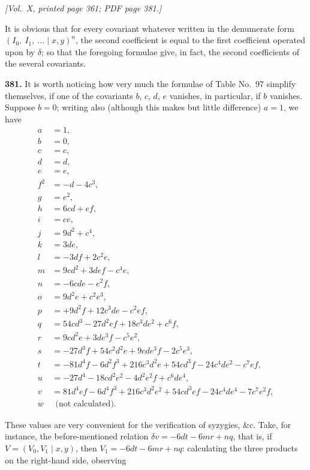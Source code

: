 \documentclass[11pt]{article}
\begin{document}
\newpage

\noindent\textit{[Vol.~X, printed page 361; PDF page 381.]}

\medskip

It is obvious that for every covariant whatever written in the denumerate form $(I_{0},\ I_{1},\ \ldots \mid x,y)^{n}$, the second coefficient is equal to the first coefficient operated upon by $\delta$; so that the foregoing formulae give, in fact, the second coefficients of the several covariants.

\medskip

\noindent\textbf{381.} It is worth noticing how very much the formulae of Table No.~97 simplify themselves, if one of the covariants $b$, $c$, $d$, $e$ vanishes, in particular, if $b$ vanishes. Suppose $b=0$; writing also (although this makes but little difference) $a=1$, we have
\begin{align*}
a &= 1, \\
b &= 0, \\
c &= c, \\
d &= d, \\
e &= e, \\
f^{2} &= -d-4c^{3}, \\
g &= e^{2}, \\
h &= 6cd+ef, \\
i &= ce, \\
j &= 9d^{2}+c^{4}, \\
k &= 3de, \\
l &= -3df+2c^{2}e, \\
m &= 9cd^{2}+3def-c^{4}e, \\
n &= -6cde-e^{2}f, \\
o &= 9d^{2}e+c^{2}e^{3}, \\
p &= +9d^{2}f+12c^{3}de-c^{2}ef, \\
q &= 54cd^{3}-27d^{2}ef+18c^{3}de^{2}+c^{6}f, \\
r &= 9cd^{2}e+3de^{3}f-c^{5}e^{2}, \\
s &= -27d^{3}f+54c^{2}d^{2}e+9cde^{3}f-2c^{5}e^{3}, \\
t &= -81d^{4}f-6d^{2}f^{3}+216c^{3}d^{2}e+54cd^{3}f-24c^{4}de^{2}-c^{7}ef, \\
u &= -27d^{4}-18cd^{2}e^{2}-4d^{2}e^{2}f+c^{6}de^{4}, \\
v &= 81d^{4}ef-6d^{4}f^{3}+216c^{3}d^{2}e^{2}+54cd^{3}ef-24c^{4}de^{4}-7c^{7}e^{2}f, \\
w &\ \ \text{(not calculated).}
\end{align*}

These values are very convenient for the verification of syzygies, \&c. Take, for instance, the before-mentioned relation $\delta v=-6dt-6mr+nq$, that is, if $V=(V_{0},V_{1} \mid x,y)$, then $V_{1}=-6dt-6mr+nq$: calculating the three products on the right-hand side, observing
\end{document}
